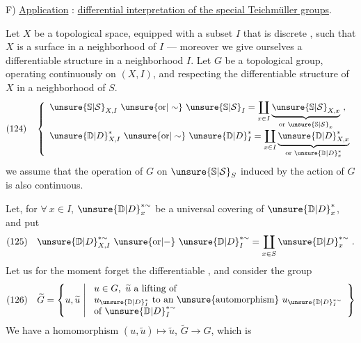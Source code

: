
F) \uline{Application} : \uline{differential interpretation of the special
Teichmüller groups}.

Let $X$ be a topological space, equipped with a subset $I$ that is discrete
, such that $X$ is a surface in a neighborhood of $I$ ---
moreover we give ourselves a differentiable structure 
in a neighborhood  $I$. Let $G$  be a
topological group, operating continuously on $(X,I)$, and respecting the
differentiable structure of $X$ in a neighborhood of $S$. 
\[
(124)\quad\left\{\begin{array}{l}
\unsure{\mathbb{S}|\mathcal{S}}_{X,I}\ \unsure{\text{or}|\sim}\ \unsure{\mathbb{S}|\mathcal{S}}_I
=\displaystyle\coprod_{x\in I}
\underbrace{\unsure{\mathbb{S}|\mathcal{S}}_{X,x}}_{\text{or }\unsure{\mathbb{S}|\mathcal{S}}_x}\ ,\\[8pt]
\unsure{\mathbb{D}|D}_{X,I}^{*}\ \unsure{\text{or}|\sim}\ \unsure{\mathbb{D}|D}_{I}^{*}
=\displaystyle\coprod_{x\in I}
\underbrace{\unsure{\mathbb{D}|D}_{X,x}^{*}}_{\text{or }\unsure{\mathbb{D}|D}_x^{*}}
\end{array}\right.
\]
we assume that the operation of $G$ on $\unsure{\mathbb{S}|\mathcal{S}}_S$ induced by
the action of $G$ is also continuous.

Let, for $\forall\ x\in I$, $\unsure{\mathbb{D}|D}_x^{*\sim}$ be a universal
covering of $\unsure{\mathbb{D}|D}_x^{*}$, and put
\[
(125)\quad
\unsure{\mathbb{D}|D}_{X,I}^{*\sim}\ \unsure{\text{or}|-}\ \unsure{\mathbb{D}|D}_I^{*\sim}
=\coprod_{x\in S}\unsure{\mathbb{D}|D}_x^{*\sim}\ .
\]
Let us for the moment forget the differentiable ,
and consider the group
\[
(126)\quad
\widetilde{G}=\left\{u,\widetilde{u}\ \middle|\
\begin{array}{l}
u\in G,\ \widetilde{u}\text{ a lifting of}\\
u_{\unsure{\mathbb{D}|D}_I^{*}}\text{ to an \unsure{automorphism} }
 u_{\unsure{\mathbb{D}|D}_I^{*\sim}}\\
\text{of }\unsure{\mathbb{D}|D}_I^{*\sim}
\end{array}\right\}
\]
We have a homomorphism $(u,\widetilde{u})\longmapsto\widetilde{u}$,
$\widetilde{G}\longrightarrow G$, which is



